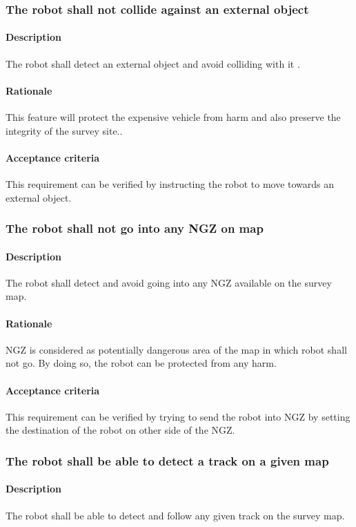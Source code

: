 \documentclass[10pt,a4paper,titlepage]{article}
\begin{document}
    \subsubsection{ The robot shall not collide against an external object}
     \paragraph{Description}   The robot shall detect an external object and avoid colliding with it .
    \paragraph{Rationale}   This feature will protect the expensive vehicle from harm and also preserve the integrity of the survey site..
    \paragraph{Acceptance criteria}   This requirement can be verified by instructing the robot to move towards an external object.
    \subsubsection{The robot shall not go into any NGZ on map}
     \paragraph{Description}   The robot shall detect and avoid going into any NGZ available on the survey map.
    \paragraph{Rationale}   NGZ is considered as potentially dangerous area of the map in which robot shall not go. By doing so, the robot can be protected from any harm.
    \paragraph{Acceptance criteria}   This requirement can be verified by trying to send the robot into NGZ by setting the destination of the robot on other side of the NGZ.
    \subsubsection{The robot shall be able to detect a track on a given map}
     \paragraph{Description}   The robot shall be able to detect and follow any given track on the survey map.
\end{document}
